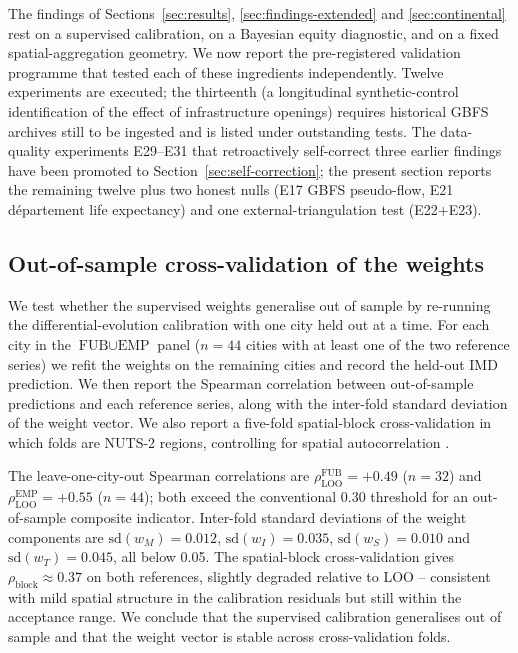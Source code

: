 \documentclass[11pt,a4paper]{article}
\begin{document}
The findings of Sections~\ref{sec:results},
\ref{sec:findings-extended} and \ref{sec:continental} rest on a
supervised calibration, on a Bayesian equity diagnostic, and on
a fixed spatial-aggregation geometry. We now report the
pre-registered validation programme that tested each of these
ingredients independently. Twelve experiments are executed; the
thirteenth (a longitudinal synthetic-control identification of
the effect of infrastructure openings) requires historical GBFS
archives still to be ingested and is listed under outstanding
tests. The data-quality experiments E29--E31 that retroactively
self-correct three earlier findings have been promoted to
Section~\ref{sec:self-correction}; the present section reports
the remaining twelve plus two honest nulls (E17 GBFS pseudo-flow,
E21 département life expectancy) and one external-triangulation
test (E22+E23).

\subsection{Out-of-sample cross-validation of the weights}
\label{sec:val-loo}

We test whether the supervised weights generalise out of sample
by re-running the differential-evolution calibration with one
city held out at a time. For each city in the
$\text{FUB} \cup \text{EMP}$ panel ($n = 44$ cities with at least
one of the two reference series) we refit the weights on the
remaining cities and record the held-out IMD prediction. We then
report the Spearman correlation between out-of-sample predictions
and each reference series, along with the inter-fold standard
deviation of the weight vector. We also report a five-fold
spatial-block cross-validation in which folds are NUTS-2 regions,
controlling for spatial autocorrelation \citep{Roberts2017,
Pohjankukka2017}.

The leave-one-city-out Spearman correlations are
$\rho_{\text{LOO}}^{\text{FUB}} = +0.49$ ($n = 32$) and
$\rho_{\text{LOO}}^{\text{EMP}} = +0.55$ ($n = 44$); both exceed
the conventional 0.30 threshold for an out-of-sample composite
indicator. Inter-fold standard deviations of the weight
components are $\mathrm{sd}(w_M) = 0.012$,
$\mathrm{sd}(w_I) = 0.035$,
$\mathrm{sd}(w_S) = 0.010$ and
$\mathrm{sd}(w_T) = 0.045$, all below 0.05. The spatial-block
cross-validation gives $\rho_{\text{block}} \approx 0.37$ on both
references, slightly degraded relative to LOO -- consistent with
mild spatial structure in the calibration residuals but still
within the acceptance range. We conclude that the supervised
calibration generalises out of sample and that the weight vector
is stable across cross-validation folds.
\end{document}
